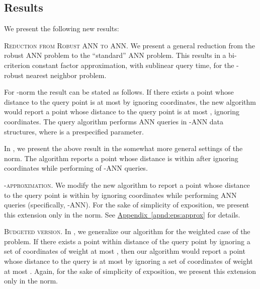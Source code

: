 \documentclass[12pt]{article}\usepackage[cm]{fullpage}
\newcommand{\Term}[1]{\textsf{#1}}
\theoremstyle{remark}\theoremheaderfont{\sf}\theorembodyfont{\upshape}\newtheorem{defn}[theorem]{Definition}
\numberwithin{figure}{section}\numberwithin{table}{section}\numberwithin{equation}{section}
\newcommand{\HLink}[2]{\hyperref[#2]{#1~\ref*{#2}}}
\newcommand{\apndref}[1]{\HLink{Appendix}{apnd:#1}}
\newcommand{\ANN}{\Term{ANN}\xspace}\newcommand{\NN}{\Term{NN}\xspace}
\begin{document}
\subsection{Results}
We present the following new results:
\begin{compactenum}[(A)]\item \textsc{Reduction from Robust \ANN to \ANN.}  We present a general reduction from the robust \ANN problem to the
    ``standard'' \ANN problem.  This results in a bi-criterion
    constant factor approximation, with sublinear query time, for the
    -robust nearest neighbor problem.
    
    \begin{compactenum}[(I)]
        \item For {-norm} the result can be stated as follows. If
        there exists a point  whose distance to the query point
         is at most  by ignoring  coordinates, the new
        algorithm would report a point  whose distance to the
        query point is at most , ignoring 
        coordinates. The query algorithm performs  \ANN
        queries in -\ANN data structures, where 
        is a prespecified parameter.

        \item In , we present the above result in
        the somewhat more general settings of the  norm.  The
        algorithm reports a point whose distance is within
         after ignoring
         coordinates while
        performing  of -\ANN queries. 
    \end{compactenum}


    \smallskip \item \textsc{-approximation.}  We modify the new algorithm to report a point whose distance to
    the query point is within  by ignoring
     coordinates while performing
     \ANN queries (specifically,
    -\ANN). For the sake of simplicity of exposition, we
    present this extension only in the  norm. See
    \apndref{eps:approx} for details.

    \smallskip \item \textsc{Budgeted version.}  In , we generalize our algorithm for the
    weighted case of the problem. If there exists a point within
    distance  of the query point by ignoring a set of coordinates
    of weight at most , then our algorithm would report a point
    whose distance to the query is at most  by ignoring a set
    of coordinates of weight at most . Again, for the sake of
    simplicity of exposition, we present this extension only in the
     norm.



\end{compactenum}
\end{document}
